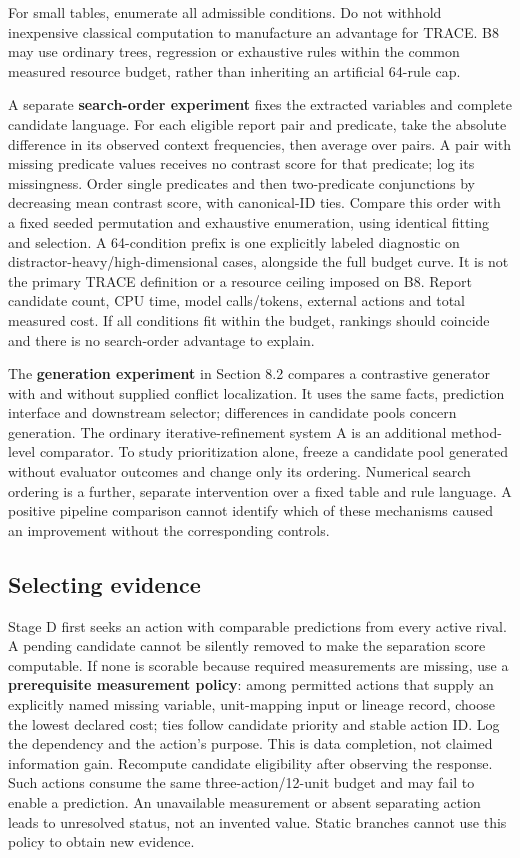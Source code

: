 \documentclass[11pt,a4paper]{article}
\begin{document}
For small tables, enumerate all admissible conditions. Do not withhold
inexpensive classical computation to manufacture an advantage for TRACE.
B8 may use ordinary trees, regression or exhaustive rules within the
common measured resource budget, rather than inheriting an artificial
64-rule cap.

A separate \textbf{search-order experiment} fixes the extracted
variables and complete candidate language. For each eligible report pair
and predicate, take the absolute difference in its observed context
frequencies, then average over pairs. A pair with missing predicate
values receives no contrast score for that predicate; log its
missingness. Order single predicates and then two-predicate conjunctions
by decreasing mean contrast score, with canonical-ID ties. Compare this
order with a fixed seeded permutation and exhaustive enumeration, using
identical fitting and selection. A 64-condition prefix is one explicitly
labeled diagnostic on distractor-heavy/high-dimensional cases, alongside
the full budget curve. It is not the primary TRACE definition or a
resource ceiling imposed on B8. Report candidate count, CPU time, model
calls/tokens, external actions and total measured cost. If all
conditions fit within the budget, rankings should coincide and there is
no search-order advantage to explain.

The \textbf{generation experiment} in Section 8.2 compares a contrastive
generator with and without supplied conflict localization. It uses the
same facts, prediction interface and downstream selector; differences in
candidate pools concern generation. The ordinary iterative-refinement
system A is an additional method-level comparator. To study
prioritization alone, freeze a candidate pool generated without
evaluator outcomes and change only its ordering. Numerical search
ordering is a further, separate intervention over a fixed table and rule
language. A positive pipeline comparison cannot identify which of these
mechanisms caused an improvement without the corresponding controls.

\subsection{Selecting evidence}\label{selecting-evidence}

Stage D first seeks an action with comparable predictions from every
active rival. A pending candidate cannot be silently removed to make the
separation score computable. If none is scorable because required
measurements are missing, use a \textbf{prerequisite measurement
policy}: among permitted actions that supply an explicitly named missing
variable, unit-mapping input or lineage record, choose the lowest
declared cost; ties follow candidate priority and stable action ID. Log
the dependency and the action's purpose. This is data completion, not
claimed information gain. Recompute candidate eligibility after
observing the response. Such actions consume the same
three-action/12-unit budget and may fail to enable a prediction. An
unavailable measurement or absent separating action leads to unresolved
status, not an invented value. Static branches cannot use this policy to
obtain new evidence.
\end{document}
